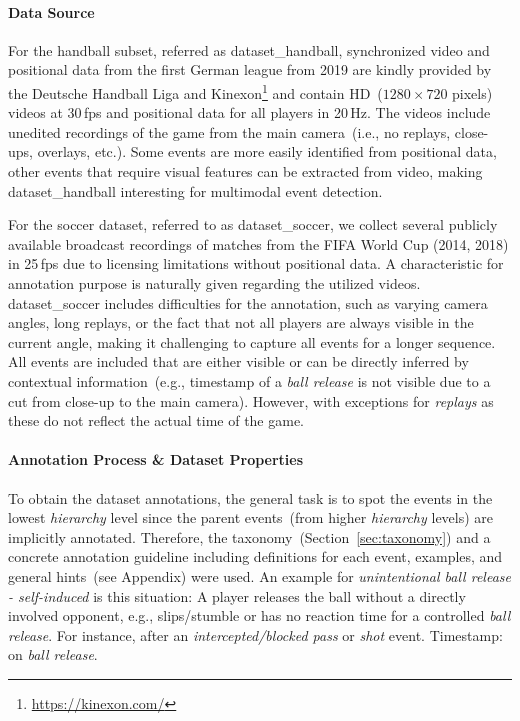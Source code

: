 \paragraph{Data Source}
For the handball subset, referred as \acrshort{dataset_handball}, synchronized video and positional data from the first German league from 2019 are kindly provided by the Deutsche Handball Liga and Kinexon\footnote{\url{https://kinexon.com/}} and contain HD~($1280 \times 720$ pixels) videos at 30\,fps and positional data for all players in 20\,Hz.
The videos include unedited recordings of the game from the main camera~(i.e., no replays, close-ups, overlays, etc.).
Some events are more easily identified from positional data, other events that require visual features can be extracted from video, making \acrshort{dataset_handball} interesting for multimodal event detection.

For the soccer dataset, referred to as \acrshort{dataset_soccer}, we collect several publicly available broadcast recordings of matches from the FIFA World Cup (2014, 2018) in 25\,fps due to licensing limitations without positional data.
A characteristic for annotation purpose is naturally given regarding the utilized videos. \acrshort{dataset_soccer} includes difficulties for the annotation, such as varying camera angles, long replays, or the fact that not all players are always visible in the current angle, making it challenging to capture all events for a longer sequence.
All events are included that are either visible or can be directly inferred by contextual information~(e.g., timestamp of a \emph{ball release} is not visible due to a cut from close-up to the main camera). However, with exceptions for \emph{replays} as these do not reflect the actual time of the game.

\paragraph{Annotation Process \& Dataset Properties}\label{sec:dataset:annotation_process}

To obtain the dataset annotations, the general task is to spot the events in the lowest \textit{hierarchy} level since the parent events~(from higher \textit{hierarchy} levels) are implicitly annotated. Therefore, the taxonomy~(Section~\ref{sec:taxonomy}) and a concrete annotation guideline including definitions for each event, examples, and general hints~(see Appendix) were used.
An example for \emph{unintentional ball release - self-induced} is this situation: A player releases the ball without a directly involved opponent, e.g., slips/stumble or has no reaction time for a controlled \textit{ball release}. For instance, after an \textit{intercepted/blocked pass} or \textit{shot} event. Timestamp: on \textit{ball release}.

